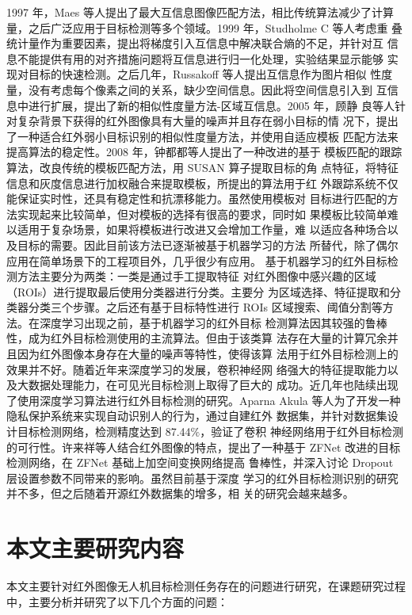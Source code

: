 1997 年，Maes 等人提出了最大互信息图像匹配方法，相比传统算法减少了计算
量，之后广泛应用于目标检测等多个领域\cite{maes1997multimodality}。1999 年，Studholme C 等人考虑重
叠统计量作为重要因素，提出将梯度引入互信息中解决联合熵的不足，并针对互
信息不能提供有用的对齐措施问题将互信息进行归一化处理，实验结果显示能够
实现对目标的快速检测\cite{studholme1999overlap}。之后几年，Russakoff 等人提出互信息作为图片相似
性度量，没有考虑每个像素之间的关系，缺少空间信息。因此将空间信息引入到
互信息中进行扩展，提出了新的相似性度量方法-区域互信息\cite{russakoff2004image}。2005 年，顾静
良等人针对复杂背景下获得的红外图像具有大量的噪声并且存在弱小目标的情
况下，提出了一种适合红外弱小目标识别的相似性度量方法，并使用自适应模板
匹配方法来提高算法的稳定性\cite{顾静良2005基于自适应模板匹配的红外弱小目标检测}。2008 年，钟都都等人提出了一种改进的基于
模板匹配的跟踪算法，改良传统的模板匹配方法，用 SUSAN 算子提取目标的角
点特征，将特征信息和灰度信息进行加权融合来提取模板，所提出的算法用于红
外跟踪系统不仅能保证实时性，还具有稳定性和抗漂移能力\cite{钟都都2008用于红外目标跟踪的模板匹配改进算法}。虽然使用模板对
目标进行匹配的方法实现起来比较简单，但对模板的选择有很高的要求，同时如
果模板比较简单难以适用于复杂场景，如果将模板进行改进又会增加工作量，难
以适应各种场合以及目标的需要。因此目前该方法已逐渐被基于机器学习的方法
所替代，除了偶尔应用在简单场景下的工程项目外，几乎很少有应用。
基于机器学习的红外目标检测方法主要分为两类：一类是通过手工提取特征
对红外图像中感兴趣的区域（ROIs）进行提取最后使用分类器进行分类。主要分
为区域选择、特征提取和分类器分类三个步骤。之后还有基于目标特性进行 ROIs
区域搜索、阈值分割等方法。在深度学习出现之前，基于机器学习的红外目标
检测算法因其较强的鲁棒性，成为红外目标检测使用的主流算法。但由于该类算
法存在大量的计算冗余并且因为红外图像本身存在大量的噪声等特性，使得该算
法用于红外目标检测上的效果并不好。随着近年来深度学习的发展，卷积神经网
络强大的特征提取能力以及大数据处理能力，在可见光目标检测上取得了巨大的
成功。近几年也陆续出现了使用深度学习算法进行红外目标检测的研究。Aparna
Akula 等人为了开发一种隐私保护系统来实现自动识别人的行为，通过自建红外
数据集，并针对数据集设计目标检测网络，检测精度达到 87.44$\%$，验证了卷积
神经网络用于红外目标检测的可行性\cite{akula2018deep}。许来祥等人结合红外图像的特点，提出了一种基于 ZFNet 改进的目标检测网络，在 ZFNet 基础上加空间变换网络提高
鲁棒性，并深入讨论 Dropout 层设置参数不同带来的影响\cite{许来祥2020基于改进}。虽然目前基于深度
学习的红外目标检测识别的研究并不多，但之后随着开源红外数据集的增多，相
关的研究会越来越多。

\section{本文主要研究内容}
本文主要针对红外图像无人机目标检测任务存在的问题进行研究，在课题研究过程中，主要分析并研究了以下几个方面的问题：

